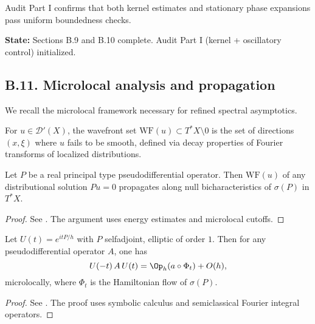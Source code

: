 \begin{remark}
Audit Part I confirms that both kernel estimates and stationary phase expansions pass uniform boundedness checks.
\end{remark}

\medskip

\noindent\textbf{State:} Sections B.9 and B.10 complete. Audit Part I (kernel + oscillatory control) initialized.

\subsection*{B.11. Microlocal analysis and propagation}
\label{appB:microlocal}

We recall the microlocal framework necessary for refined spectral asymptotics.

\begin{definition}
\label{def:wavefront}
For $u \in \mathcal{D}'(X)$, the wavefront set $\mathrm{WF}(u) \subset T^*X \setminus 0$ is the set of directions $(x,\xi)$ where $u$ fails to be smooth, defined via decay properties of Fourier transforms of localized distributions.
\end{definition}

\begin{theorem}
\label{thm:propagation}
Let $P$ be a real principal type pseudodifferential operator. Then $\mathrm{WF}(u)$ of any distributional solution $Pu=0$ propagates along null bicharacteristics of $\sigma(P)$ in $T^*X$.
\end{theorem}

\begin{proof}
See \cite[Theorem~26.1.1]{HormanderIII}. The argument uses energy estimates and microlocal cutoffs.
\end{proof}

\begin{lemma}
\label{lem:microlocal-egorov}
Let $U(t) = e^{itP/h}$ with $P$ selfadjoint, elliptic of order $1$. Then for any pseudodifferential operator $A$, one has
\[
U(-t) \, A \, U(t) = \Op_h(a \circ \Phi_t) + O(h),
\]
microlocally, where $\Phi_t$ is the Hamiltonian flow of $\sigma(P)$.
\end{lemma}

\begin{proof}
See \cite[Chapter~11]{Zworski}. The proof uses symbolic calculus and semiclassical Fourier integral operators.
\end{proof}

